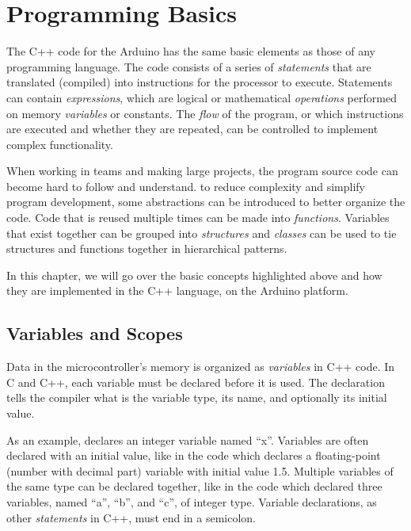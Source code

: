 
\chapter{Programming Basics}

The C++ code for the Arduino has the same basic elements as those of any programming language. 
The code consists of a series of \emph{statements} that are translated (compiled) into instructions for the processor to execute.
Statements can contain \emph{expressions}, which are logical or mathematical \emph{operations} performed on memory \emph{variables} or constants.
The \emph{flow} of the program, or which instructions are executed and whether they are repeated, can be controlled to implement complex functionality.

When working in teams and making large projects, the program source code can become hard to follow and understand.
to reduce complexity and simplify program development, some abstractions can be introduced to better organize the code.
Code that is reused multiple times can be made into \emph{functions}.
Variables that exist together can be grouped into \emph{structures} and \emph{classes} can be used to tie structures and functions together in hierarchical patterns.

In this chapter, we will go over the basic concepts highlighted above and how they are implemented in the C++ language, on the Arduino platform.

\section{Variables and Scopes}
Data in the microcontroller's memory is organized as \emph{variables} in C++ code.
In C and C++, each variable must be declared before it is used.
The declaration tells the compiler what is the variable type, its name, and optionally its initial value.

As an example,  declares an integer variable named ``x''.
Variables are often declared with an initial value, like in the code  which declares a floating-point (number with decimal part) variable with initial value \num{1.5}.
Multiple variables of the same type can be declared together, like in the code  which declared three variables, named ``a'', ``b'', and ``c'', of integer type.
Variable declarations, as other \emph{statements} in C++, must end in a semicolon.

